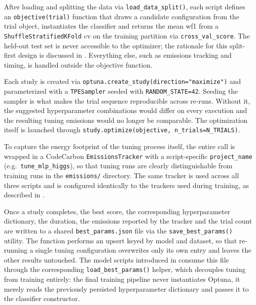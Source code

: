 After loading and splitting the data via \texttt{load\_data\_split()}, each script defines an \texttt{objective(trial)} function that draws a candidate configuration from the trial object, instantiates the classifier and returns the mean \gls{wf1} from a \texttt{ShuffleStratifiedKFold} \gls{cv} on the training partition via \texttt{cross\_val\_score}. The held-out test set is never accessible to the optimizer; the rationale for this split-first design is discussed in . Everything else, such as emissions tracking and timing, is handled outside the objective function.

Each study is created via \texttt{optuna.create\_study(direction="maximize")} and parameterized with a \texttt{TPESampler} seeded with \texttt{RANDOM\_STATE=42}. Seeding the sampler is what makes the trial sequence reproducible across re-runs. Without it, the suggested hyperparameter combinations would differ on every execution and the resulting tuning emissions would no longer be comparable. The optimization itself is launched through \texttt{study.optimize(objective, n\_trials=N\_TRIALS)}.

To capture the energy footprint of the tuning process itself, the entire  call is wrapped in a CodeCarbon \texttt{EmissionsTracker} with a script-specific \texttt{project\_name} (e.g.\ \texttt{tune\_mlp\_higgs}), so that tuning runs are clearly distinguishable from training runs in the \texttt{emissions/} directory. The same tracker is used across all three scripts and is configured identically to the trackers used during training, as described in .

Once a study completes, the best score, the corresponding hyperparameter dictionary, the duration, the emissions reported by the tracker and the trial count are written to a shared \texttt{best\_params.json} file via the \texttt{save\_best\_params()} utility. The function performs an upsert keyed by model and dataset, so that re-running a single tuning configuration overwrites only its own entry and leaves the other results untouched. The model scripts introduced in  consume this file through the corresponding \texttt{load\_best\_params()} helper, which decouples tuning from training entirely: the final training pipeline never instantiates Optuna, it merely reads the previously persisted hyperparameter dictionary and passes it to the classifier constructor.


